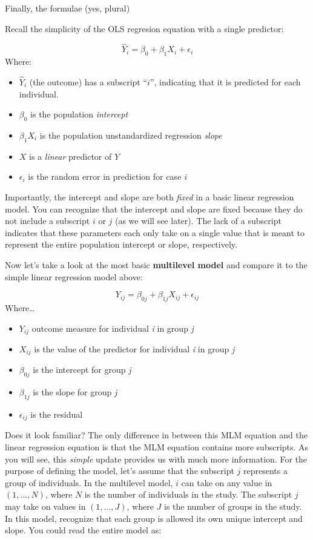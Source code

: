 \documentclass[
  english,
]{book}
\providecommand{\tightlist}{%
  \setlength{\itemsep}{0pt}\setlength{\parskip}{0pt}}
\begin{document}
Finally, the formulae (yes, plural)

Recall the simplicity of the OLS regresion equation with a single predictor:

\[\hat{Y}_{i} = \beta_{0} + \beta_{1}X_{i} + \epsilon_{i}\]
Where:

\begin{itemize}
\tightlist
\item
  \(\hat{Y}_{i}\) (the outcome) has a subscript ``\(i\)'', indicating that it is predicted for each individual.
\item
  \(\beta_{0}\) is the population \emph{intercept}
\item
  \(\beta_{1}X_{i}\) is the population unstandardized regression \emph{slope}
\item
  \(X\) is a \emph{linear} predictor of \(Y\)
\item
  \(\epsilon_{i}\) is the random error in prediction for case \emph{i}
\end{itemize}

Importantly, the intercept and slope are both \emph{fixed} in a basic linear regression model. You can recognize that the intercept and slope are fixed because they do not include a subscript \(i\) or \(j\) (as we will see later). The lack of a subscript indicates that these parameters each only take on a single value that is meant to represent the entire population intercept or slope, respectively.

Now let's take a look at the most basic \textbf{multilevel model} and compare it to the simple linear regression model above:

\[ Y_{ij} = \beta_{0j} + \beta_{1j}X_{ij} + \epsilon_{ij} \]
Where\ldots{}

\begin{itemize}
\tightlist
\item
  \(Y_{ij}\) outcome measure for individual \emph{i} in group \emph{j}
\item
  \(X_{ij}\) is the value of the predictor for individual \emph{i} in group \emph{j}
\item
  \(\beta_{0j}\) is the intercept for group \emph{j}
\item
  \(\beta_{1j}\) is the slope for group \emph{j}
\item
  \(\epsilon_{ij}\) is the residual
\end{itemize}

Does it look familiar? The only difference in between this MLM equation and the linear regression equation is that the MLM equation contains more subscripts. As you will see, this \emph{simple} update provides us with much more information. For the purpose of defining the model, let's assume that the subscript \(j\) represents a group of individuals. In the multilevel model, \(i\) can take on any value in \((1, ..., N)\), where \(N\) is the number of individuals in the study. The subscript \(j\) may take on values in \((1, ..., J)\), where \(J\) is the number of groups in the study. In this model, recognize that each group is allowed its own unique intercept and slope. You could read the entire model as:
\end{document}
